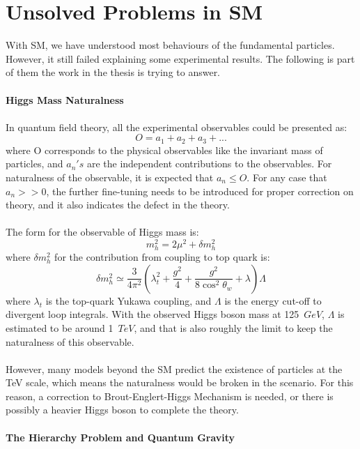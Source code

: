 \section{Unsolved Problems in SM}
With SM, we have understood most behaviours of the fundamental particles. However, it still failed explaining some experimental results. The following is part of them the work in the thesis is trying to answer.
\\
\\{\bf Higgs Mass Naturalness\cite{WILLIAMS201582}}
\\
\\In quantum field theory, all the experimental observables could be presented as:
\begin{equation}
O=a_1+a_2+a_3+...
\end{equation}
where O corresponds to the physical observables like the invariant mass of particles, and $a_n's$ are the independent contributions to the observables. For naturalness of the observable, it is expected that $a_n\leq O$. For any case that $a_n>>0$, the further fine-tuning needs to be introduced for proper correction on theory, and it also indicates the defect in the theory. \\
\\The form for the observable of Higgs mass is:
\begin{equation}
m_h^2=2\mu^2+\delta m_h^2
\end{equation}
where $\delta m_h^2$ for the contribution from coupling to top quark is:
\begin{equation}
\delta m_h^2 \simeq \frac{3}{4\pi^2}\left(\lambda^2_t+\frac{g^2}{4}+\frac{g^2}{8\cos^2{\theta_w}}+\lambda\right)\Lambda
\end{equation}
where $\lambda_t$ is the top-quark Yukawa coupling, and $\Lambda$ is the energy cut-off to divergent loop integrals. With the observed Higgs boson mass at 125~$GeV$, $\Lambda$ is estimated to be around 1~$TeV$, and that is also roughly the limit to keep the naturalness of this observable. 
\\
\\However, many models beyond the SM predict the existence of particles at the TeV scale, which means the naturalness would be broken in the scenario. For this reason, a correction to Brout-Englert-Higgs Mechanism is needed, or there is possibly a heavier Higgs boson to complete the theory.  
\\
\\{\bf The Hierarchy Problem and Quantum Gravity\cite{BenA}}
\\
